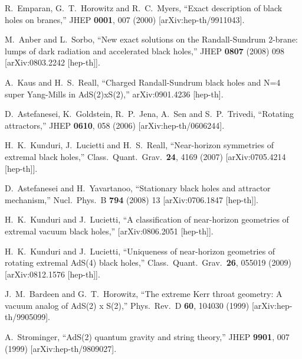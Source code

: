 \documentclass[12pt]{article}
\begin{document}
\begin{thebibliography}{99}
  R.~Emparan, G.~T.~Horowitz and R.~C.~Myers,
  ``Exact description of black holes on branes,''
  JHEP {\bf 0001}, 007 (2000)
  [arXiv:hep-th/9911043].

  M.~Anber and L.~Sorbo,
  ``New exact solutions on the Randall-Sundrum 2-brane: lumps of dark radiation
  and accelerated black holes,''
  JHEP {\bf 0807} (2008) 098
  [arXiv:0803.2242 [hep-th]].




  A.~Kaus and H.~S.~Reall,
  ``Charged Randall-Sundrum black holes and N=4 super Yang-Mills in
  AdS(2)xS(2),''
  arXiv:0901.4236 [hep-th].




  D.~Astefanesei, K.~Goldstein, R.~P.~Jena, A.~Sen and S.~P.~Trivedi,
  ``Rotating attractors,''
  JHEP {\bf 0610}, 058 (2006)
  [arXiv:hep-th/0606244].

  H.~K.~Kunduri, J.~Lucietti and H.~S.~Reall,
  ``Near-horizon symmetries of extremal black holes,''
  Class.\ Quant.\ Grav.\  {\bf 24}, 4169 (2007)
  [arXiv:0705.4214 [hep-th]].

  D.~Astefanesei and H.~Yavartanoo,
  ``Stationary black holes and attractor mechanism,''
  Nucl.\ Phys.\  B {\bf 794} (2008) 13
  [arXiv:0706.1847 [hep-th]].

  H.~K.~Kunduri and J.~Lucietti,
  ``A classification of near-horizon geometries of extremal vacuum black
  holes,''
  [arXiv:0806.2051 [hep-th]].

  H.~K.~Kunduri and J.~Lucietti,
  ``Uniqueness of near-horizon geometries of rotating extremal AdS(4) black
  holes,''
  Class.\ Quant.\ Grav.\  {\bf 26}, 055019 (2009)
  [arXiv:0812.1576 [hep-th]].

  J.~M.~Bardeen and G.~T.~Horowitz,
  ``The extreme Kerr throat geometry: A vacuum analog of AdS(2) x S(2),''
  Phys.\ Rev.\  D {\bf 60}, 104030 (1999)
  [arXiv:hep-th/9905099].



  A.~Strominger,
  ``AdS(2) quantum gravity and string theory,''
  JHEP {\bf 9901}, 007 (1999)
  [arXiv:hep-th/9809027].



\end{thebibliography}
\end{document}
